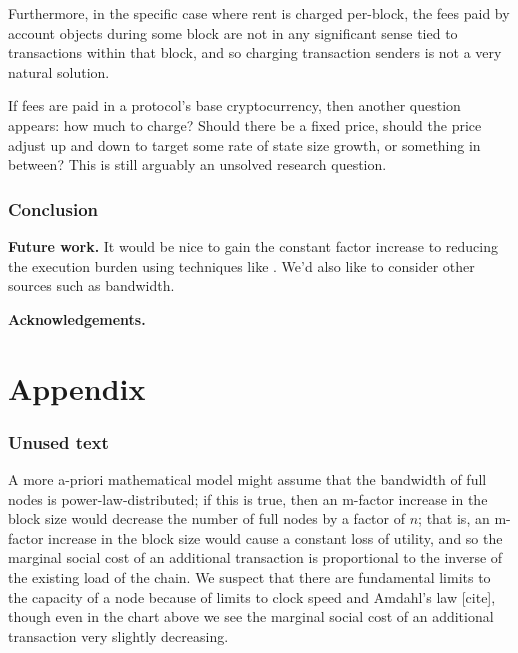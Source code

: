 \documentclass[12pt, final]{article}
\begin{document}
Furthermore, in the specific case where rent is charged per-block, the fees paid by account objects during some block are not in any significant sense tied to transactions within that block, and so charging transaction senders is not a very natural solution.

If fees are paid in a protocol's base cryptocurrency, then another question appears: how much to charge? Should there be a fixed price, should the price adjust up and down to target some rate of state size growth, or something in between? This is still arguably an unsolved research question.




\section{Conclusion}


\textbf{Future work.}  It would be nice to gain the constant factor increase to reducing the execution burden using techniques like \cite{truebit}.  We'd also like to consider other sources such as bandwidth.

\textbf{Acknowledgements.} 





\newpage
\appendix
\part*{Appendix}

\section{Unused text}



A more a-priori mathematical model might assume that the bandwidth of full nodes is power-law-distributed; if this is true, then an m-factor increase in the block size would decrease the number of full nodes by a factor of $n$; that is, an m-factor increase in the block size would cause a constant loss of utility, and so the marginal social cost of an additional transaction is proportional to the inverse of the existing load of the chain. We suspect that there are fundamental limits to the capacity of a node because of limits to clock speed and Amdahl's law [cite], though even in the chart above we see the marginal social cost of an additional transaction very slightly decreasing. 
\end{document}
